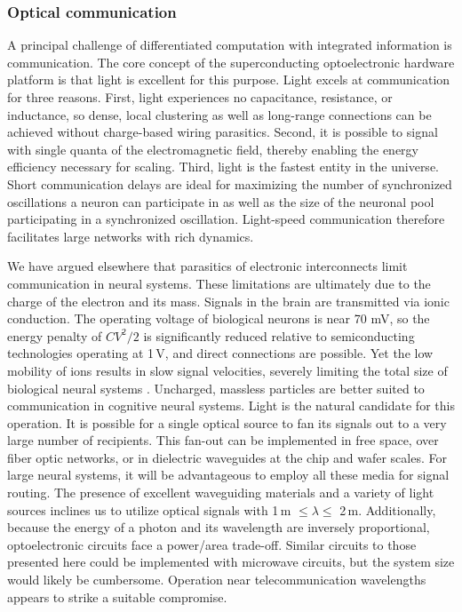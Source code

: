 \documentclass[twocolumn]{article}
\begin{document}
\subsubsection{Optical communication}
A principal challenge of differentiated computation with integrated information is communication. The core concept of the superconducting optoelectronic hardware platform is that light is excellent for this purpose. Light excels at communication for three reasons. First, light experiences no capacitance, resistance, or inductance, so dense, local clustering as well as long-range connections can be achieved without charge-based wiring parasitics. Second, it is possible to signal with single quanta of the electromagnetic field, thereby enabling the energy efficiency necessary for scaling. Third, light is the fastest entity in the universe. Short communication delays are ideal for maximizing the number of synchronized oscillations a neuron can participate in as well as the size of the neuronal pool participating in a synchronized oscillation. Light-speed communication therefore facilitates large networks with rich dynamics.

We have argued elsewhere \cite{shbu2017} that parasitics of electronic interconnects limit communication in neural systems. These limitations are ultimately due to the charge of the electron and its mass. Signals in the brain are transmitted via ionic conduction. The operating voltage of biological neurons is near 70 mV, so the energy penalty of $C V^2/2$ is significantly reduced relative to semiconducting technologies operating at 1\,V, and direct connections are possible. Yet the low mobility of ions results in slow signal velocities, severely limiting the total size of biological neural systems \cite{bu2006}. Uncharged, massless particles are better suited to communication in cognitive neural systems. Light is the natural candidate for this operation. It is possible for a single optical source to fan its signals out to a very large number of recipients. This fan-out can be implemented in free space, over fiber optic networks, or in dielectric waveguides at the chip and wafer scales. For large neural systems, it will be advantageous to employ all these media for signal routing. The presence of excellent waveguiding materials and a variety of light sources inclines us to utilize optical signals with 1\,\textmu m $\le \lambda \le$ 2\,\textmu m. Additionally, because the energy of a photon and its wavelength are inversely proportional, optoelectronic circuits face a power/area trade-off. Similar circuits to those presented here could be implemented with microwave circuits, but the system size would likely be cumbersome. Operation near telecommunication wavelengths appears to strike a suitable compromise. 
\end{document}
